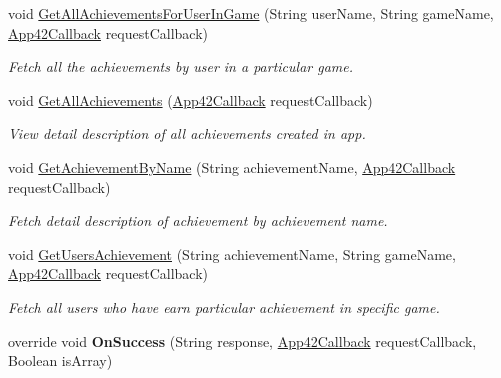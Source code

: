 \begin{DoxyCompactItemize}
void \hyperlink{classcom_1_1shephertz_1_1app42_1_1paas_1_1sdk_1_1windows_1_1achievement_1_1_achievement_service_a9052b8cab149cc20190176b4ad50a6d3}{Get\+All\+Achievements\+For\+User\+In\+Game} (String user\+Name, String game\+Name, \hyperlink{interfacecom_1_1shephertz_1_1app42_1_1paas_1_1sdk_1_1windows_1_1_app42_callback}{App42\+Callback} request\+Callback)
\begin{DoxyCompactList}\small\item\em Fetch all the achievements by user in a particular game. \end{DoxyCompactList}\item 
void \hyperlink{classcom_1_1shephertz_1_1app42_1_1paas_1_1sdk_1_1windows_1_1achievement_1_1_achievement_service_a18843fff41a195c519758cfd7ca497b3}{Get\+All\+Achievements} (\hyperlink{interfacecom_1_1shephertz_1_1app42_1_1paas_1_1sdk_1_1windows_1_1_app42_callback}{App42\+Callback} request\+Callback)
\begin{DoxyCompactList}\small\item\em View detail description of all achievements created in app. \end{DoxyCompactList}\item 
void \hyperlink{classcom_1_1shephertz_1_1app42_1_1paas_1_1sdk_1_1windows_1_1achievement_1_1_achievement_service_ab56eb4aedd68940d16614aab5b685ae3}{Get\+Achievement\+By\+Name} (String achievement\+Name, \hyperlink{interfacecom_1_1shephertz_1_1app42_1_1paas_1_1sdk_1_1windows_1_1_app42_callback}{App42\+Callback} request\+Callback)
\begin{DoxyCompactList}\small\item\em Fetch detail description of achievement by achievement name. \end{DoxyCompactList}\item 
void \hyperlink{classcom_1_1shephertz_1_1app42_1_1paas_1_1sdk_1_1windows_1_1achievement_1_1_achievement_service_ac4637cbaa96470b3a7dba8a24fd37d9f}{Get\+Users\+Achievement} (String achievement\+Name, String game\+Name, \hyperlink{interfacecom_1_1shephertz_1_1app42_1_1paas_1_1sdk_1_1windows_1_1_app42_callback}{App42\+Callback} request\+Callback)
\begin{DoxyCompactList}\small\item\em Fetch all users who have earn particular achievement in specific game. \end{DoxyCompactList}\item 
\hypertarget{classcom_1_1shephertz_1_1app42_1_1paas_1_1sdk_1_1windows_1_1achievement_1_1_achievement_service_a186fe876144a49d0f2485acda2de7d62}{override void {\bfseries On\+Success} (String response, \hyperlink{interfacecom_1_1shephertz_1_1app42_1_1paas_1_1sdk_1_1windows_1_1_app42_callback}{App42\+Callback} request\+Callback, Boolean is\+Array)}\label{classcom_1_1shephertz_1_1app42_1_1paas_1_1sdk_1_1windows_1_1achievement_1_1_achievement_service_a186fe876144a49d0f2485acda2de7d62}


\end{DoxyCompactItemize}
